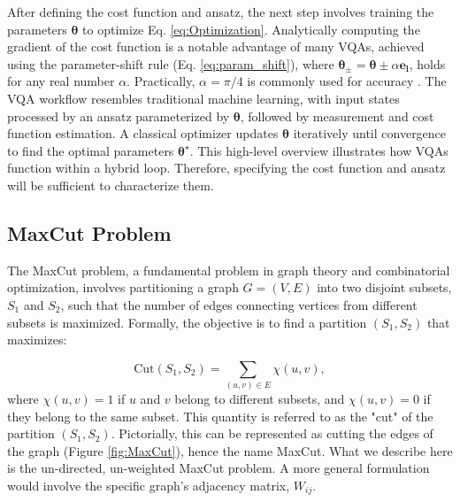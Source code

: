  After defining the cost function and ansatz, the next step involves training the parameters \(\boldsymbol{\theta}\) to optimize Eq. \ref{eq:Optimization}. Analytically computing the gradient of the cost function is a notable advantage of many VQAs, achieved using the parameter-shift rule (Eq. \ref{eq:param_shift}), where \(\boldsymbol{\theta_{\pm}} = \boldsymbol{\theta} \pm \alpha \boldsymbol{e_l}\), holds for any real number \(\alpha\). Practically, \(\alpha = \pi/4\) is commonly used for accuracy \cite{Cerezo_2021}. The VQA workflow resembles traditional machine learning, with input states processed by an ansatz parameterized by \(\boldsymbol{\theta}\), followed by measurement and cost function estimation. A classical optimizer updates \(\boldsymbol{\theta}\) iteratively until convergence to find the optimal parameters \(\boldsymbol{\theta}^{\star}\). This high-level overview illustrates how VQAs function within a hybrid loop. Therefore, specifying the cost function and ansatz will be sufficient to characterize them.


\subsection{MaxCut Problem}
\label{sec: MaxCut}
The MaxCut problem, a fundamental problem in graph theory and combinatorial optimization, involves partitioning a graph \( G = (V, E) \) into two disjoint subsets, \( S_1 \) and \( S_2 \), such that the number of edges connecting vertices from different subsets is maximized. Formally, the objective is to find a partition \( (S_1, S_2) \) that maximizes:

\begin{equation}\label{eq:Cut}
\text{Cut}(S_1, S_2) = \sum_{(u, v) \in E} \chi(u, v),
\end{equation}
where \( \chi(u, v) = 1 \) if \( u \) and \( v \) belong to different subsets, and \( \chi(u, v) = 0 \) if they belong to the same subset. This quantity is referred to as the "cut" of the partition $(S_1, S_2)$. Pictorially, this can be represented as cutting the edges of the graph (Figure \ref{fig:MaxCut}), hence the name MaxCut. What we describe here is the un-directed, un-weighted MaxCut problem. A more general formulation would involve the specific graph's adjacency matrix, $W_{ij}$. %


